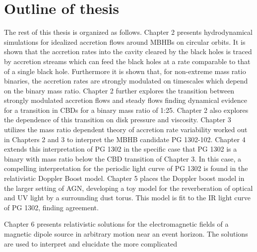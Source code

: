 \section{Outline of thesis} 
The rest of this thesis is organized as follows.
Chapter 2 presents hydrodynamical simulations for idealized accretion flows
around MBHBs on circular orbits. It is shown that the accretion rates into the
cavity cleared by the black holes is traced by accretion streams which can
feed the black holes at a rate comparable to that of a single black hole.
Furthermore it is shown that, for non-extreme mass ratio binaries, the
accretion rates are strongly modulated on timescales which depend on the
binary mass ratio. Chapter 2 further explores the transition between strongly
modulated accretion flows and steady flows finding dynamical evidence for a
transition in CBDs for a binary mass ratio of 1:25. Chapter 2 also explores
the dependence of this transition on disk pressure and viscosity. Chapter 3
utilizes the mass ratio dependent theory of accretion rate variability worked
out in Chapters 2 and 3 to interpret the MBHB candidate PG 1302-102. Chapter 4
extends this interpretation of PG 1302 in the specific case that PG 1302 is a
binary with mass ratio below the CBD transition of Chapter 3. In this case, a
compelling interpretation for the periodic light curve of PG 1302 is found in
the relativistic Doppler Boost model. Chapter 5 places the Doppler boost model
in the larger setting of AGN, developing a toy model for the reverberation of
optical and UV light by a surrounding dust torus. This model is fit to the IR
light curve of PG 1302, finding agreement.

Chapter 6 presents relativistic solutions for the electromagnetic fields of a
magnetic dipole source in arbitrary motion near an event horizon. The
solutions are used to interpret and elucidate the more complicated























 
 
